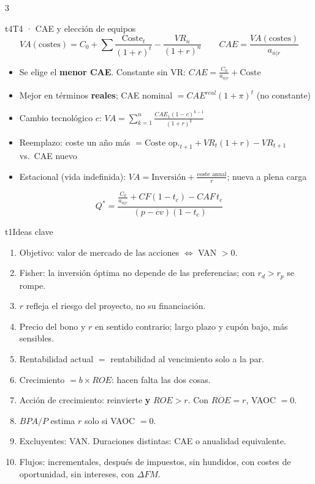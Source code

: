 \documentclass[9pt]{extarticle}
\newcommand{\sub}[1]{\par\smallskip{\color{black!75}\bfseries\footnotesize #1}\par}
\newcommand{\an}[2]{a_{\overline{#1}\rvert #2}}
\begin{document}
\begin{multicols*}{3}
\begin{bloque}{t4}{T4 · CAE y elección de equipos}
\[VA(\text{costes})=C_0+\textstyle\sum\frac{\text{Coste}_t}{(1+r)^t}-\frac{VR_n}{(1+r)^n}\qquad CAE=\frac{VA(\text{costes})}{\an{n}{r}}\]
\begin{itemize}
\item Se elige el \textbf{menor CAE}. Constante sin VR: $CAE=\frac{C_0}{\an{n}{r}}+\text{Coste}$
\item Mejor en términos \textbf{reales}; CAE nominal $=CAE^{real}(1+\pi)^t$ (no constante)
\item Cambio tecnológico $c$: $VA=\sum_{k=1}^{n}\frac{CAE_1(1-c)^{k-1}}{(1+r)^k}$
\item Reemplazo: coste un año más $=\text{Coste op.}_{t+1}+VR_t(1+r)-VR_{t+1}$ vs.\ CAE nuevo
\item Estacional (vida indefinida): $VA=\text{Inversión}+\frac{\text{coste anual}}{r}$; nueva a plena carga
\end{itemize}
\sub{Punto muerto del VAN}
\[Q^*=\frac{\frac{C_0}{\an{n}{r}}+CF(1-t_c)-CAF\,t_c}{(p-cv)(1-t_c)}\]
\end{bloque}



\begin{bloque}{t1}{Ideas clave}
\begin{enumerate}[label=\arabic*., leftmargin=1.3em]
\item Objetivo: valor de mercado de las acciones $\iff$ VAN $>0$.
\item Fisher: la inversión óptima no depende de las preferencias; con $r_d>r_p$ se rompe.
\item $r$ refleja el riesgo del proyecto, no su financiación.
\item Precio del bono y $r$ en sentido contrario; largo plazo y cupón bajo, más sensibles.
\item Rentabilidad actual $=$ rentabilidad al vencimiento solo a la par.
\item Crecimiento $= b\times ROE$: hacen falta las dos cosas.
\item Acción de crecimiento: reinvierte \textbf{y} $ROE>r$. Con $ROE=r$, VAOC $=0$.
\item $BPA/P$ estima $r$ solo si VAOC $=0$.
\item Excluyentes: VAN. Duraciones distintas: CAE o anualidad equivalente.
\item Flujos: incrementales, después de impuestos, sin hundidos, con costes de oportunidad, sin intereses, con $\Delta FM$.
\end{enumerate}
\end{bloque}


\end{multicols*}
\end{document}

